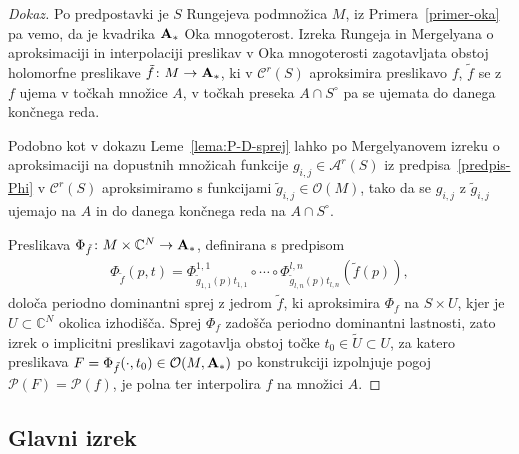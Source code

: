 \documentclass[12pt,a4paper,twoside]{article}
\theoremstyle{definition} %
\newenvironment{dokaz}[1][Dokaz]{\begin{proof}[#1]}{\end{proof}}
\theoremstyle{plain} %
\numberwithin{equation}{section}  %
\begin{document}
\begin{dokaz}
Po predpostavki je $S$ Rungejeva podmnožica $M$, iz Primera~\ref{primer-oka} pa vemo, da je kvadrika $\textbf{\textup{A}}_{*}$ Oka mnogoterost.
Izreka Rungeja in Mergelyana o aproksimaciji in interpolaciji preslikav v Oka mnogoterosti zagotavljata obstoj holomorfne preslikave $\tilde{f} \colon M \to \textbf{\textup{A}}_{*}$, ki v $\mathcal{C}^{r}(S)$ aproksimira preslikavo $f$, $\tilde{f}$ se z $f$ ujema v točkah množice $A$, v točkah preseka $A \cap S^{\circ}$ pa se ujemata do danega končnega reda.

Podobno kot v dokazu Leme~\ref{lema:P-D-sprej} lahko po Mergelyanovem izreku o aproksimaciji na dopustnih množicah funkcije $g_{i,j} \in \mathcal{A}^{r}(S)$ iz predpisa~\eqref{predpis-Phi} v $\mathcal{C}^{r}(S)$ aproksimiramo s funkcijami $\tilde{g}_{i,j} \in \mathcal{O}(M)$, tako da se $g_{i,j}$ z $\tilde{g}_{i,j}$ ujemajo na $A$ in do danega končnega reda na $A \cap S^{\circ}$.

Preslikava $\Phi_{\tilde{f}} \colon M \times \mathbb{C}^{N} \to \textbf{\textup{A}}_{*}$, definirana s predpisom
\begin{gather}
\Phi_{\tilde{f}}(p,t) = \Phi_{\tilde{g}_{1,1}(p)t_{1,1}}^{1,1} \circ \cdots \circ \Phi_{\tilde{g}_{l,n}(p)t_{l,n}}^{l,n} (\tilde{f}(p)),
\end{gather}
določa periodno dominantni sprej z jedrom $\tilde{f}$, ki aproksimira $\Phi_{f}$ na $S \times U$, kjer je $U \subset \mathbb{C}^{N}$ okolica izhodišča.
Sprej $\Phi_{f}$ zadošča periodno dominantni lastnosti, zato izrek o implicitni preslikavi zagotavlja obstoj točke $t_0 \in \tilde{U} \subset U$, za katero preslikava $F = \Phi_{\tilde{f}}(\cdot, t_0) \in \mathcal{O}(M, \textbf{\textup{A}}_{*})$ po konstrukciji izpolnjuje pogoj $\mathcal{P}(F) = \mathcal{P}(f)$, je polna ter interpolira $f$ na množici $A$.
\end{dokaz}

\subsection{Glavni izrek}

\end{document}
